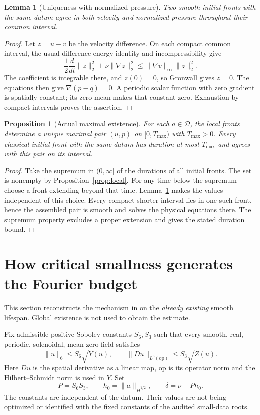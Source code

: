 \documentclass[11pt,a4paper]{article}
\numberwithin{equation}{section}
\theoremstyle{plain}
\newtheorem{proposition}[theorem]{Proposition}
\newtheorem{lemma}[theorem]{Lemma}
\theoremstyle{definition}
\theoremstyle{remark}
\newcommand{\D}{\mathcal D}
\newcommand{\HH}[1]{\dot H^{#1}}
\newcommand{\norm}[2]{\lVert #1\rVert_{#2}}
\newcommand{\Tmax}{T_{\max}}
\begin{document}
\begin{lemma}[Uniqueness with normalized pressure]\label{lem:unique}
Two smooth initial fronts with the same datum agree in both velocity and
normalized pressure throughout their common interval.
\end{lemma}
\begin{proof}
Let $z=u-v$ be the velocity difference. On each compact common interval,
the usual difference-energy identity and incompressibility give
\[
 \frac12\frac{d}{dt}\norm{z}{2}^2+\nu\norm{\nabla z}{2}^2
 \le \norm{\nabla v}{\infty}\norm{z}{2}^2.
\]
The coefficient is integrable there, and $z(0)=0$, so Gronwall gives $z=0$.
The equations then give $\nabla(p-q)=0$. A periodic scalar function with
zero gradient is spatially constant; its zero mean makes that constant
zero. Exhaustion by compact intervals proves the assertion.
\end{proof}

\begin{proposition}[Actual maximal existence]\label{prop:maximal}
For each $a\in\D$, the local fronts determine a unique maximal pair
$(u,p)$ on $[0,\Tmax)$ with $\Tmax>0$. Every classical initial front with
the same datum has duration at most $\Tmax$ and agrees with this pair on
its interval.
\end{proposition}
\begin{proof}
Take the supremum in $(0,\infty]$ of the durations of all initial fronts.
The set is nonempty by Proposition~\ref{prop:local}. For any time below
the supremum choose a front extending beyond that time. Lemma~\ref{lem:unique}
makes the values independent of this choice. Every compact shorter
interval lies in one such front, hence the assembled pair is smooth and
solves the physical equations there. The supremum property excludes a
proper extension and gives the stated duration bound.
\end{proof}

\section{How critical smallness generates the Fourier budget}\label{sec:smallbudget}
This section reconstructs the mechanism in \cite[Lemmas~4.1--4.2]{small}
on the \emph{already existing} smooth lifespan. Global existence is not
used to obtain the estimate.

Fix admissible positive Sobolev constants $S_6,S_3$ such that every
smooth, real, periodic, solenoidal, mean-zero field satisfies
\begin{equation}\label{eq:sobolev}
 \norm{u}{6}\le S_6\sqrt{Y(u)},\qquad
 \norm{Du}{L^3(\mathrm{op})}\le S_3\sqrt{Z(u)}.
\end{equation}
Here $Du$ is the spatial derivative as a linear map, $\mathrm{op}$ is its
operator norm and the Hilbert--Schmidt norm is used in $Y$. Set
\begin{equation}\label{eq:margin}
 P=S_6S_3,\qquad h_0=\norm{a}{\HH{1/2}},\qquad \delta=\nu-Ph_0.
\end{equation}
The constants are independent of the datum. Their values are not being
optimized or identified with the fixed constants of the audited
small-data roots.
\end{document}
